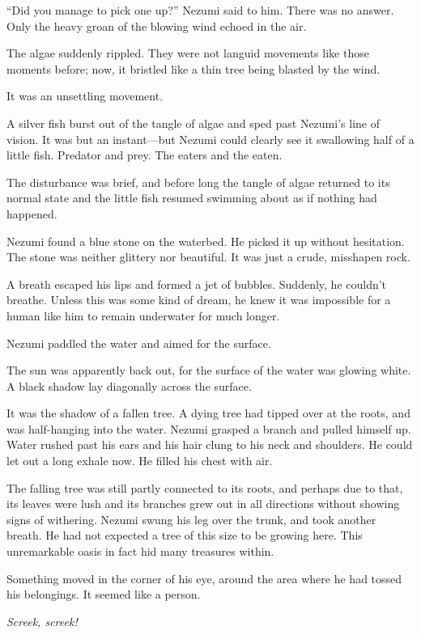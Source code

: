 ``Did you manage to pick one up?'' Nezumi said to him. There was no
answer. Only the heavy groan of the blowing wind echoed in the air.

\mybreak

The algae suddenly rippled. They were not languid movements like those
moments before; now, it bristled like a thin tree being blasted by the
wind.

It was an unsettling movement.

A silver fish burst out of the tangle of algae and sped past
Nezumi's line of vision. It was but an instant---but Nezumi could clearly
see it swallowing half of a little fish. Predator and prey. The eaters
and the eaten.

The disturbance was brief, and before long the tangle of algae returned
to its normal state and the little fish resumed swimming about as if
nothing had happened.

Nezumi found a blue stone on the waterbed. He picked it up without
hesitation. The stone was neither glittery nor beautiful. It was just a
crude, misshapen rock.

A breath escaped his lips and formed a jet of bubbles. Suddenly, he
couldn't breathe. Unless this was some kind of dream, he knew it was
impossible for a human like him to remain underwater for much longer.

Nezumi paddled the water and aimed for the surface.

The sun was apparently back out, for the surface of the water was
glowing white. A black shadow lay diagonally across the surface.

It was the shadow of a fallen tree. A dying tree had tipped over at the
roots, and was half-hanging into the water. Nezumi grasped a branch and
pulled himself up. Water rushed past his ears and his hair clung to his
neck and shoulders. He could let out a long exhale now. He filled his
chest with air.

The falling tree was still partly connected to its roots, and perhaps
due to that, its leaves were lush and its branches grew out in all
directions without showing signs of withering. Nezumi swung his leg over
the trunk, and took another breath. He had not expected a tree of this
size to be growing here. This unremarkable oasis in fact hid many
treasures within.

Something moved in the corner of his eye, around the area where he had
tossed his belongings. It seemed like a person.

\emph{Screek, screek!}

